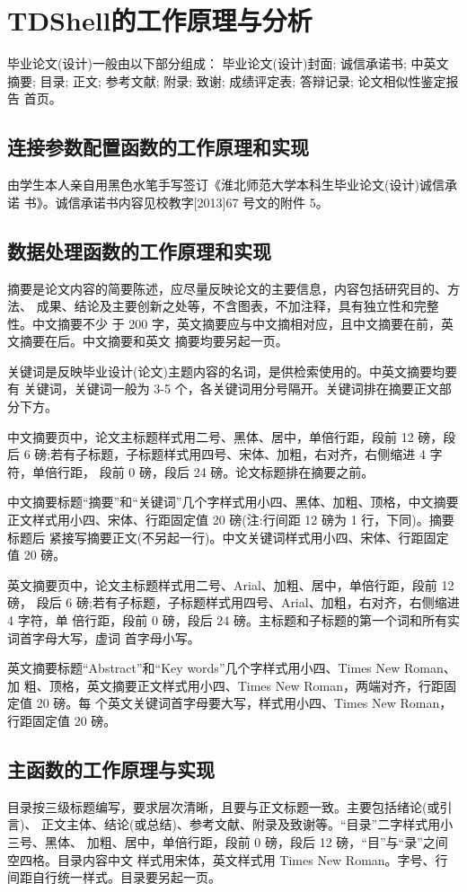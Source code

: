 \chapter{TDShell的工作原理与分析}
毕业论文(设计)一般由以下部分组成：\cite{1}
\subitem 毕业论文(设计)封面;
\subitem 诚信承诺书;
\subitem 中英文摘要;
\subitem 目录;
\subitem 正文;
\subitem 参考文献;
\subitem 附录;
\subitem 致谢;
\subitem 成绩评定表;
\subitem 答辩记录;
\subitem 论文相似性鉴定报告 首页。

\section{连接参数配置函数的工作原理和实现}

由学生本人亲自用黑色水笔手写签订《淮北师范大学本科生毕业论文(设计)诚信承诺 书》。诚信承诺书内容见校教字[2013]67 号文的附件 5。

\section{数据处理函数的工作原理和实现}

摘要是论文内容的简要陈述，应尽量反映论文的主要信息，内容包括研究目的、方法、 成果、结论及主要创新之处等，不含图表，不加注释，具有独立性和完整性。中文摘要不少 于 200 字，英文摘要应与中文摘相对应，且中文摘要在前，英文摘要在后。中文摘要和英文 摘要均要另起一页。

关键词是反映毕业设计(论文)主题内容的名词，是供检索使用的。中英文摘要均要有 关键词，关键词一般为 3-5 个，各关键词用分号隔开。关键词排在摘要正文部分下方。

中文摘要页中，论文主标题样式用二号、黑体、居中，单倍行距，段前 12 磅，段后 6 磅;若有子标题，子标题样式用四号、宋体、加粗，右对齐，右侧缩进 4 字符，单倍行距， 段前 0 磅，段后 24 磅。论文标题排在摘要之前。

中文摘要标题“摘要”和“关键词”几个字样式用小四、黑体、加粗、顶格，中文摘要 正文样式用小四、宋体、行距固定值 20 磅(注:行间距 12 磅为 1 行，下同)。摘要标题后 紧接写摘要正文(不另起一行)。中文关键词样式用小四、宋体、行距固定值 20 磅。

英文摘要页中，论文主标题样式用二号、Arial、加粗、居中，单倍行距，段前 12 磅， 段后 6 磅;若有子标题，子标题样式用四号、Arial、加粗，右对齐，右侧缩进 4 字符，单 倍行距，段前 0 磅，段后 24 磅。主标题和子标题的第一个词和所有实词首字母大写，虚词 首字母小写。

英文摘要标题“Abstract”和“Key words”几个字样式用小四、Times New Roman、加 粗、顶格，英文摘要正文样式用小四、Times New Roman，两端对齐，行距固定值 20 磅。每 个英文关键词首字母要大写，样式用小四、Times New Roman，行距固定值 20 磅。

\section{主函数的工作原理与实现}
目录按三级标题编写，要求层次清晰，且要与正文标题一致。主要包括绪论(或引言)、 正文主体、结论(或总结)、参考文献、附录及致谢等。“目录”二字样式用小三号、黑体、 加粗、居中，单倍行距，段前 0 磅，段后 12 磅，“目”与“录”之间空四格。目录内容中文 样式用宋体，英文样式用 Times New Roman。字号、行间距自行统一样式。目录要另起一页。

